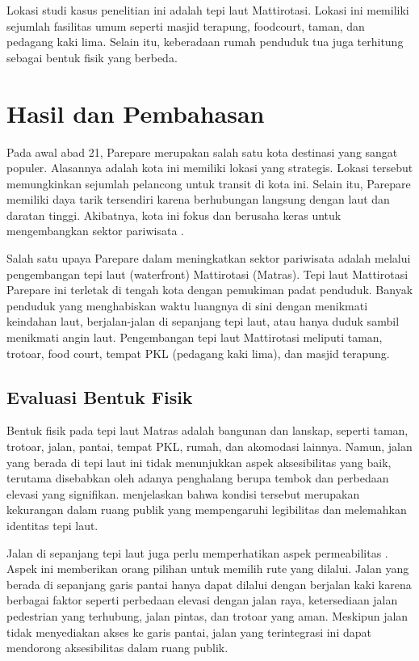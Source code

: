 \documentclass[11pt]{simart} %
\begin{document}
Lokasi studi kasus penelitian ini adalah tepi laut Mattirotasi. Lokasi ini memiliki sejumlah fasilitas umum seperti masjid terapung, foodcourt, taman, dan pedagang kaki lima. Selain itu, keberadaan rumah penduduk tua juga terhitung sebagai bentuk fisik yang berbeda.

\section{Hasil dan Pembahasan}%

Pada awal abad 21, Parepare merupakan salah satu kota destinasi yang sangat populer. Alasannya adalah kota ini memiliki lokasi yang strategis. Lokasi tersebut memungkinkan sejumlah pelancong untuk transit di kota ini. Selain itu, Parepare memiliki daya tarik tersendiri karena berhubungan langsung dengan laut dan daratan tinggi. Akibatnya, kota ini fokus dan berusaha keras untuk mengembangkan sektor pariwisata \citep{faniapriani2018}.

Salah satu upaya Parepare dalam meningkatkan sektor pariwisata adalah melalui pengembangan tepi laut (waterfront) Mattirotasi (Matras). Tepi laut Mattirotasi Parepare ini terletak di tengah kota dengan pemukiman padat penduduk. Banyak penduduk yang menghabiskan waktu luangnya di sini dengan menikmati keindahan laut, berjalan-jalan di sepanjang tepi laut, atau hanya duduk sambil menikmati angin laut. Pengembangan tepi laut Mattirotasi meliputi taman, trotoar, food court, tempat PKL (pedagang kaki lima), dan masjid terapung.

\subsection{Evaluasi Bentuk Fisik}%
\label{sub:Evaluasi Bentuk Fisik}

Bentuk fisik pada tepi laut Matras adalah bangunan dan lanskap, seperti taman, trotoar, jalan, pantai, tempat PKL, rumah, dan akomodasi lainnya. Namun, jalan yang berada di tepi laut ini tidak menunjukkan aspek aksesibilitas yang baik, terutama disebabkan oleh adanya penghalang berupa tembok dan perbedaan elevasi yang signifikan. \cite{iqbal2020} menjelaskan bahwa kondisi tersebut merupakan kekurangan dalam ruang publik yang mempengaruhi legibilitas dan melemahkan identitas tepi laut.

Jalan di sepanjang tepi laut juga perlu memperhatikan aspek permeabilitas \citep{wanismail2018}. Aspek ini memberikan orang pilihan untuk memilih rute yang dilalui. Jalan yang berada di sepanjang garis pantai hanya dapat dilalui dengan berjalan kaki karena berbagai faktor seperti perbedaan elevasi dengan jalan raya, ketersediaan jalan pedestrian yang terhubung, jalan pintas, dan trotoar yang aman. Meskipun jalan tidak menyediakan akses ke garis pantai, jalan yang terintegrasi ini dapat mendorong aksesibilitas dalam ruang publik.
\end{document}
